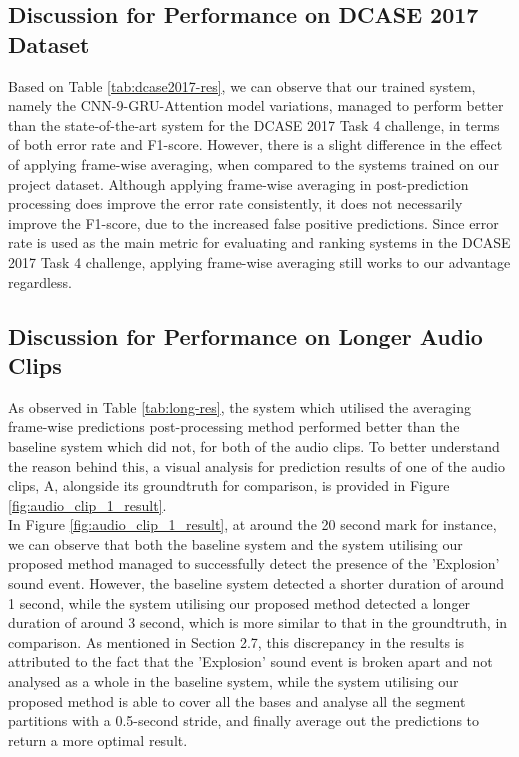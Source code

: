 \subsection{Discussion for Performance on DCASE 2017 Dataset}
Based on Table \ref{tab:dcase2017-res}, we can observe that our trained system, namely the CNN-9-GRU-Attention model variations, managed to perform better than the state-of-the-art system \cite{kong2020sound} for the DCASE 2017 Task 4 challenge, in terms of both error rate and F1-score. However, there is a slight difference in the effect of applying frame-wise averaging, when compared to the systems trained on our project dataset. Although applying frame-wise averaging in post-prediction processing does improve the error rate consistently, it does not necessarily improve the F1-score, due to the increased false positive predictions. Since error rate is used as the main metric for evaluating and ranking systems in the DCASE 2017 Task 4 challenge, applying frame-wise averaging still works to our advantage regardless.

\subsection{Discussion for Performance on Longer Audio Clips}
As observed in Table \ref{tab:long-res}, the system which utilised the averaging frame-wise predictions post-processing method performed better than the baseline system which did not, for both of the audio clips. To better understand the reason behind this, a visual analysis for prediction results of one of the audio clips, A, alongside its groundtruth for comparison, is provided in Figure \ref{fig:audio_clip_1_result}.\\

In Figure \ref{fig:audio_clip_1_result}, at around the 20 second mark for instance, we can observe that both the baseline system and the system utilising our proposed method managed to successfully detect the presence of the 'Explosion' sound event. However, the baseline system detected a shorter duration of around 1 second, while the system utilising our proposed method detected a longer duration of around 3 second, which is more similar to that in the groundtruth, in comparison. As mentioned in Section 2.7, this discrepancy in the results is attributed to the fact that the 'Explosion' sound event is broken apart and not analysed as a whole in the baseline system, while the system utilising our proposed method is able to cover all the bases and analyse all the segment partitions with a 0.5-second stride, and finally average out the predictions to return a more optimal result.\\

